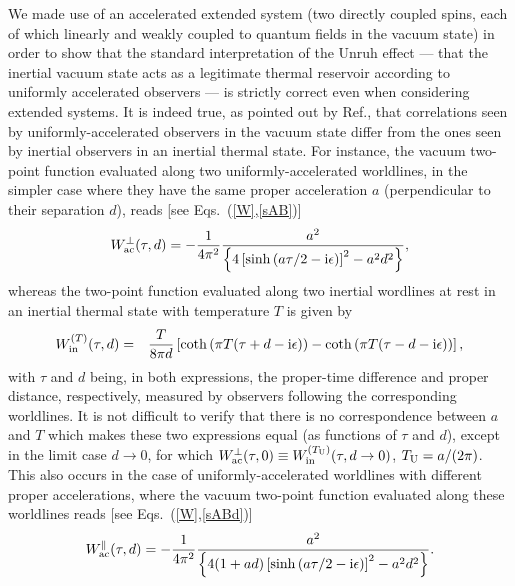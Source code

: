 \documentclass[]{nature}
\begin{document}
{ We made use of an accelerated extended system (two directly coupled spins, 
each of which linearly and weakly 
 coupled to  quantum fields in the vacuum state)
 in order to show 
that the standard interpretation of the Unruh effect ---
that the inertial vacuum state acts as a legitimate thermal reservoir according to uniformly accelerated 
observers --- is strictly correct even when considering extended systems.
It is indeed true, as pointed out by Ref.\cite{AS},  that correlations 
seen by uniformly-accelerated observers in the vacuum state differ 
from the ones seen by inertial observers in an inertial thermal state.
For instance, the vacuum two-point function evaluated along two uniformly-accelerated worldlines,
in the simpler case where they have the same proper acceleration $a$ (perpendicular to their separation $d$), reads [see Eqs.~(\ref{W},\ref{sAB})]
\begin{eqnarray}
W^\bot_{{\rm ac}}(\tau,d) = -\frac{1}{4\pi^2}\frac{a^2}{\left\{4\left[\sinh\left(a\tau/2-{\rm i}\epsilon\right)\right]^2-a^2d^2\right\}},
\label{Waccelperp}
\end{eqnarray}
whereas the two-point function evaluated along two inertial wordlines 
at rest in an inertial thermal state with temperature $T$ is given by\cite{Weldon}
\begin{eqnarray}
W^{(T)}_{\rm in}(\tau,d)& =& \frac{T}{8\pi d}\left[\coth\left(\pi T (\tau+d-{\rm i}\epsilon)\right)-\coth\left(\pi T (\tau-d-{\rm i}\epsilon)\right)\right],
\label{Wthermal}
\end{eqnarray}
with $\tau$ and $d$ being, in both expressions, the  proper-time difference 
and  proper distance, respectively, measured by observers following the corresponding
worldlines. It is not difficult to verify that there is no correspondence between $a$ and $T$ which makes these
two expressions equal (as functions of $\tau$ and $d$),  except in the limit case 
$d\to 0$, for which $W^\bot_{\rm ac}(\tau,0) \equiv W^{(T_{\rm U})}_{\rm in}
(\tau,d\to 0)$,
$T_{\rm U} = a/(2\pi)$. 
This also occurs in the case of uniformly-accelerated worldlines with different proper 
accelerations, where
the vacuum two-point function evaluated along these worldlines reads [see Eqs.~(\ref{W},\ref{sABd})]
\begin{eqnarray}
W^{\parallel}_{\rm ac}(\tau,d) = -\frac{1}{4\pi^2}\frac{a^2}{\left\{4(1+ad)
\left[\sinh\left(a\tau/2-{\rm i}\epsilon\right)\right]^2-a^2d^2\right\}}.
\label{Waccelpar}
\end{eqnarray}
}
\end{document}
